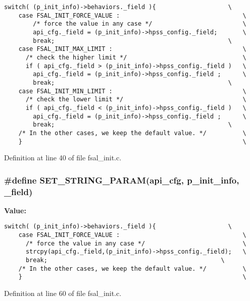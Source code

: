 \footnotesize\begin{verbatim}switch( (p_init_info)->behaviors._field ){                    \
    case FSAL_INIT_FORCE_VALUE :                                  \
        /* force the value in any case */                         \
        api_cfg._field = (p_init_info)->hpss_config._field;       \
        break;                                                \
    case FSAL_INIT_MAX_LIMIT :                                    \
      /* check the higher limit */                                \
      if ( api_cfg._field > (p_init_info)->hpss_config._field )   \
        api_cfg._field = (p_init_info)->hpss_config._field ;      \
        break;                                                \
    case FSAL_INIT_MIN_LIMIT :                                    \
      /* check the lower limit */                                 \
      if ( api_cfg._field < (p_init_info)->hpss_config._field )   \
        api_cfg._field = (p_init_info)->hpss_config._field ;      \
        break;                                                \
    /* In the other cases, we keep the default value. */          \
    }                                                             \
\end{verbatim}\normalsize 


Definition at line 40 of file fsal\_\-init.c.
\subsubsection{\setlength{\rightskip}{0pt plus 5cm}\#define SET\_\-STRING\_\-PARAM(api\_\-cfg, p\_\-init\_\-info, \_\-field)}\label{fsal__init_8c_a2}


{\bf Value:}

\footnotesize\begin{verbatim}switch( (p_init_info)->behaviors._field ){                    \
    case FSAL_INIT_FORCE_VALUE :                                  \
      /* force the value in any case */                           \
      strcpy(api_cfg._field,(p_init_info)->hpss_config._field);   \
      break;                                                \
    /* In the other cases, we keep the default value. */          \
    }                                                             \
\end{verbatim}\normalsize 


Definition at line 60 of file fsal\_\-init.c.

